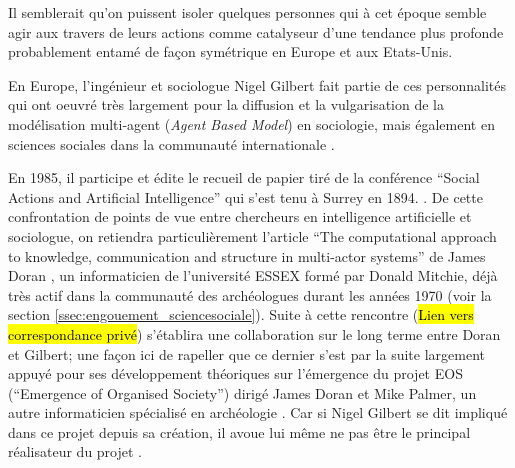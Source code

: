 


Il semblerait qu'on puissent isoler quelques personnes qui à cet époque semble agir aux travers de leurs actions comme catalyseur d'une tendance plus profonde probablement entamé de façon symétrique en Europe et aux Etats-Unis.

En Europe, l'ingénieur et sociologue Nigel Gilbert fait partie de ces personnalités qui ont oeuvré très largement pour la diffusion et la vulgarisation de la modélisation multi-agent (\textit{Agent Based Model}) en sociologie, mais également en sciences sociales dans la communauté internationale .

En 1985, il participe et édite le recueil de papier tiré de la conférence \foreignquote{english}{Social Actions and Artificial Intelligence} qui s'est tenu à Surrey en 1894. \autocite{Gilbert1985}. De cette confrontation de points de vue entre chercheurs en intelligence artificielle et sociologue, on retiendra particulièrement l'article \foreignquote{english}{The computational approach to knowledge, communication and structure in multi-actor systems} de James Doran \autocite{Doran1985}, un informaticien de l'université ESSEX formé par Donald Mitchie, déjà très actif dans la communauté des archéologues durant les années 1970 (voir la section \ref{ssec:engouement_sciencesociale}). Suite à cette rencontre (\hl{Lien vers correspondance privé}) s'établira une collaboration sur le long terme entre Doran et Gilbert; une façon ici de rapeller que ce dernier s'est par la suite largement appuyé pour ses développement théoriques sur l'émergence du projet EOS (\foreignquote{english}{Emergence of Organised Society}) dirigé James Doran et Mike Palmer, un autre informaticien spécialisé en archéologie \autocite{Doran1994a, Gilbert1995a}. Car si Nigel Gilbert se dit impliqué dans ce projet depuis sa création, il avoue lui même ne pas être le principal réalisateur du projet . \autocite[122-131]{Gilbert1995a}


